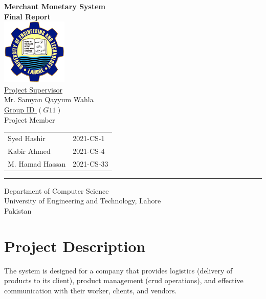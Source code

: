 \documentclass[12pt,a4paper]{article}
\begin{document}
\thispagestyle{empty}
\begin{center}
\textbf{\large{Merchant Monetary System}}\\
\vspace{1cm}
\textbf{ Final Report} \\
\vspace{2cm}
\includegraphics[scale=.08]{UETLogo}\\
\vspace{2cm}
\underline{ Project Supervisor}\\
\vspace{1cm}
Mr. Samyan Qayyum Wahla\\
\vspace{1cm}
\underline {Group ID $(G 11)$} \\
\vspace{1cm}
Project Member\\
\vspace{0.5cm}
\begin{tabular}{ m{5cm} m{4cm}}
 Syed Hashir & 2021-CS-1 \\ 
 Kabir Ahmed & 2021-CS-4  \\  
 M. Hamad Hassan & 2021-CS-33
\end{tabular}
\vspace{5.5cm}
\par\rule{\textwidth}{0.5pt} 
Department of Computer Science\\
University of Engineering and Technology, Lahore\\
Pakistan
\end{center}
\tableofcontents
\thispagestyle{empty}

\newpage
\setcounter{page}{1}
\justifying
\section{Project Description}

The system is designed for a company that provides
logistics (delivery of products to its client), product management (crud operations), and effective communication with their worker, clients, and vendors.
 
\end{document}
